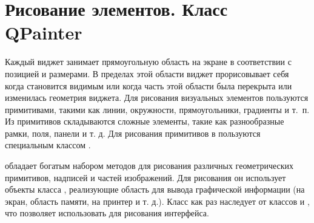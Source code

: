 \section[Рисование элементов. Класс QPainter]{Рисование элементов. Класс QPainter}
Каждый виджет занимает прямоугольную область на экране в соответствии с позицией и размерами. В пределах этой области
виджет прорисовывает себя когда становится видимым или когда часть этой области была перекрыта или изменилась геометрия
виджета. Для рисования визуальных элементов пользуются примитивами, такими как линии, окружности, прямоугольники,
градиенты и т.~п. Из примитивов складываются сложные элементы, такие как разнообразные рамки, поля, панели и т. д. Для
рисования примитивов в  пользуются специальным классом .

 обладает богатым набором методов для рисования различных геометрических примитивов, надписей и
частей изображений. Для рисования он использует объекты класса ,
реализующие область для вывода графической информации (на экран, область памяти, на принтер и т. д.). Класс
 как раз наследует от классов  и 
, что позволяет использовать  для рисования интерфейса.

